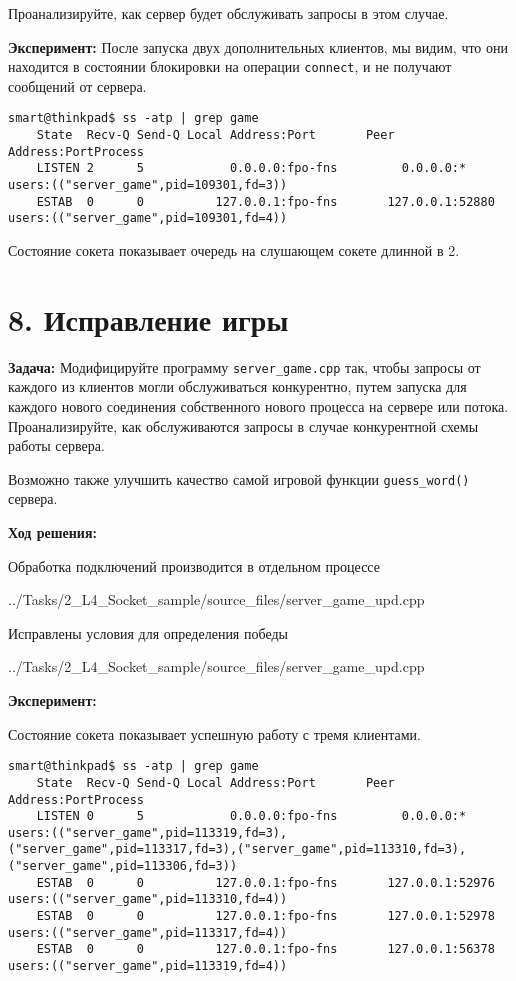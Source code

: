 Проанализируйте, как сервер будет обслуживать запросы в этом случае.

\textbf{Эксперимент:} После запуска двух дополнительных клиентов, мы видим, что они находится в состоянии блокировки на операции \texttt{connect}, и не получают сообщений от сервера.

\begin{Verbatim}[frame=single]
    smart@thinkpad$ ss -atp | grep game
    State  Recv-Q Send-Q Local Address:Port       Peer Address:PortProcess
    LISTEN 2      5            0.0.0.0:fpo-fns         0.0.0.0:*         users:(("server_game",pid=109301,fd=3))
    ESTAB  0      0          127.0.0.1:fpo-fns       127.0.0.1:52880     users:(("server_game",pid=109301,fd=4))
\end{Verbatim}
Состояние сокета показывает очередь на слушающем сокете длинной в 2.

\section*{8. Исправление игры}
\textbf{Задача:} Модифицируйте программу \texttt{server\_game.cpp} так, чтобы запросы от каждого из клиентов могли обслуживаться конкурентно, путем запуска для каждого нового соединения собственного нового процесса на сервере или потока. Проанализируйте, как обслуживаются запросы в случае конкурентной схемы работы сервера.

Возможно также улучшить качество самой игровой функции \texttt{guess\_word()} сервера.

\textbf{Ход решения:}

Обработка подключений производится в отдельном процессе

{../Tasks/2_L4_Socket_sample/source_files/server_game_upd.cpp}

Исправлены условия для определения победы

{../Tasks/2_L4_Socket_sample/source_files/server_game_upd.cpp}

\textbf{Эксперимент:}

Состояние сокета показывает успешную работу с тремя клиентами.
\begin{Verbatim}[frame=single]
    smart@thinkpad$ ss -atp | grep game
    State  Recv-Q Send-Q Local Address:Port       Peer Address:PortProcess
    LISTEN 0      5            0.0.0.0:fpo-fns         0.0.0.0:*           users:(("server_game",pid=113319,fd=3),("server_game",pid=113317,fd=3),("server_game",pid=113310,fd=3),("server_game",pid=113306,fd=3))
    ESTAB  0      0          127.0.0.1:fpo-fns       127.0.0.1:52976       users:(("server_game",pid=113310,fd=4))                                                                                                
    ESTAB  0      0          127.0.0.1:fpo-fns       127.0.0.1:52978       users:(("server_game",pid=113317,fd=4))                                                                                                
    ESTAB  0      0          127.0.0.1:fpo-fns       127.0.0.1:56378       users:(("server_game",pid=113319,fd=4))
\end{Verbatim}

